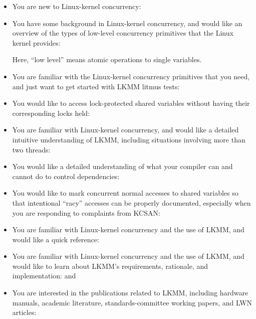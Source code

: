 \begin{itemize}
  \item You are new to Linux-kernel concurrency:

  \item You have some background in Linux-kernel concurrency, and would
	like an overview of the types of low-level concurrency primitives
	that the Linux kernel provides:

	Here, ``low level'' means atomic operations to single variables.

  \item You are familiar with the Linux-kernel concurrency primitives
	that you need, and just want to get started with LKMM litmus
	tests:

  \item You would like to access lock-protected shared variables without
	having their corresponding locks held:

  \item You are familiar with Linux-kernel concurrency, and would
	like a detailed intuitive understanding of LKMM, including
	situations involving more than two threads:

  \item You would like a detailed understanding of what your compiler can
	and cannot do to control dependencies:

  \item You would like to mark concurrent normal accesses to shared
	variables so that intentional ``racy'' accesses can be properly
	documented, especially when you are responding to complaints
	from KCSAN\@:

  \item You are familiar with Linux-kernel concurrency and the use of
	LKMM, and would like a quick reference:

  \item You are familiar with Linux-kernel concurrency and the use
	of LKMM, and would like to learn about LKMM's requirements,
	rationale, and implementation:
	 and 

  \item You are interested in the publications related to LKMM, including
	hardware manuals, academic literature, standards-committee
	working papers, and LWN articles:
\end{itemize}



